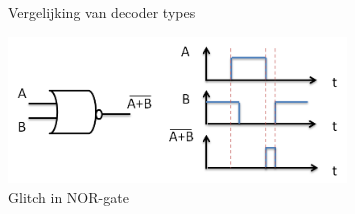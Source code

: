 \begin{figure}[!ht]
\centering
{}
\caption[Vergelijking van decoder types]{Vergelijking van decoder types}
\end{figure}



\begin{figure}[!ht]
  \centering
  \includegraphics[width=0.8\textwidth]{../fig/hfdst-decoders-glitch.png}
  \caption[Glitch in NOR-gate]{Glitch in NOR-gate}
  \label{fig:decoder_glitch}
\end{figure}


